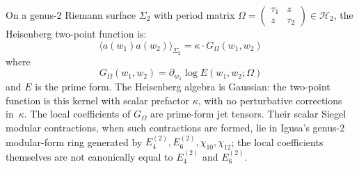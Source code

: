 \begin{theorem}\label{thm:heisenberg-genus-two}
On a genus-2 Riemann surface $\Sigma_2$ with period matrix
$\Omega = \begin{pmatrix} \tau_1 & z \\ z & \tau_2 \end{pmatrix} \in \mathcal{H}_2$,
the Heisenberg two-point function is:
\begin{equation}
\langle a(w_1) a(w_2) \rangle_{\Sigma_2} = \kappa \cdot G_{\Omega}(w_1, w_2)
\end{equation}
where
\[
G_\Omega(w_1,w_2)=\partial_{w_1}\log E(w_1,w_2;\Omega)
\]
and $E$ is the prime form. The Heisenberg algebra is Gaussian:
the two-point function is this kernel with scalar prefactor
$\kappa$, with no perturbative corrections in~$\kappa$. The local
coefficients of $G_\Omega$ are prime-form jet tensors. Their scalar
Siegel modular contractions, when such contractions are formed, lie
in Igusa's genus-2 modular-form ring generated by
$E_4^{(2)},E_6^{(2)},\chi_{10},\chi_{12}$; the local coefficients
themselves are not canonically equal to $E_4^{(2)}$ and
$E_6^{(2)}$.
\end{theorem}

